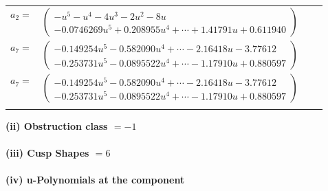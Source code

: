 \documentclass[1p]{elsarticle_modified}
\theoremstyle{definition}
\begin{document}
\begin{tabular}{m{7pt} m{180pt} m{7pt} m{180pt} }
\flushright $a_{2}=$&$\begin{pmatrix}- u^5- u^4-4 u^3-2 u^2-8 u\\-0.0746269 u^{5}+0.208955 u^{4}+\cdots+1.41791 u+0.611940\end{pmatrix}$ \\
\flushright $a_{7}=$&$\begin{pmatrix}-0.149254 u^{5}-0.582090 u^{4}+\cdots-2.16418 u-3.77612\\-0.253731 u^{5}-0.0895522 u^{4}+\cdots-1.17910 u+0.880597\end{pmatrix}$\\ \flushright $a_{7}=$&$\begin{pmatrix}-0.149254 u^{5}-0.582090 u^{4}+\cdots-2.16418 u-3.77612\\-0.253731 u^{5}-0.0895522 u^{4}+\cdots-1.17910 u+0.880597\end{pmatrix}$\\&\end{tabular}
\flushleft \textbf{(ii) Obstruction class $= -1$}\\~\\
\flushleft \textbf{(iii) Cusp Shapes $= 6$}\\~\\
\newpage\renewcommand{\arraystretch}{1}
\flushleft \textbf{(iv) u-Polynomials at the component}\newline \\
\end{document}
